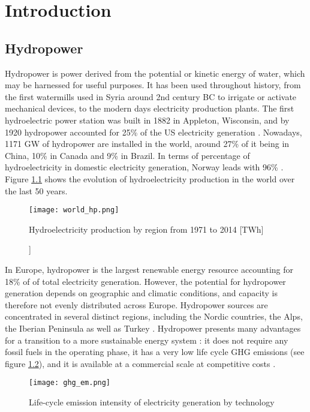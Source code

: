 \chapter{Introduction}
\label{chap:introduction}


\section{Hydropower}

Hydropower is power derived from the potential or kinetic energy of water, which may be harnessed for useful purposes. It has been used throughout history, from the first watermills used in Syria around 2nd century BC \cite{reynolds} to irrigate or activate mechanical devices, to the modern days electricity production plants. The first hydroelectric power station was built in 1882 in Appleton, Wisconsin, and by 1920 hydropower accounted for 25\% of the US electricity generation \cite{hist_hyd}. \newline
Nowadays, 1171 GW of hydropower are installed in the world, around 27\% of it being in China, 10\% in Canada and 9\% in Brazil. In terms of percentage of hydroelectricity in domestic electricity generation, Norway leads with 96\% \cite{iea_stat}. Figure \ref{world_hp} shows the evolution of hydroelectricity production in the world over the last 50 years.

\begin{figure}[H]
\centering
\texttt{[image: world\_hp.png]}
\caption[Hydroelectricity production by region from 1971 to 2014 [TWh]]{Hydroelectricity production by region from 1971 to 2014 [TWh] \cite{iea_stat}}
\centering
\label{world_hp}
\end{figure}

In Europe, hydropower is the largest renewable energy resource accounting for 18\% of of total electricity generation. However, the potential for hydropower generation depends on geographic and climatic conditions, and capacity is therefore not evenly distributed across Europe. Hydropower sources are concentrated in several distinct regions, including the Nordic countries, the Alps, the Iberian Peninsula as well as Turkey \cite{hp_europe}. Hydropower presents many advantages for a transition to a more sustainable energy system : it does not require any fossil fuels in the operating phase, it has a very low life cycle GHG emissions (see figure \ref{ghg_em}), and it is available at a commercial scale at competitive costs \cite{hp_europe}. 

\begin{figure}[H]
\centering
\texttt{[image: ghg\_em.png]}
\caption[Life-cycle emission intensity of electricity generation by technology]{Life-cycle emission intensity of electricity generation by technology \cite{hp_europe}}
\label{ghg_em}
\end{figure}

